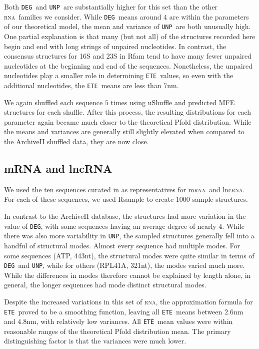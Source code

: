 \documentclass{article}
\newcommand{\RNA}{\textsc{rna}}
\newcommand{\DEG}{{\tt DEG}}
\newcommand{\UNP}{{\tt UNP}}
\newcommand{\ETE}{{\tt ETE}}
\begin{document}
Both \DEG\ and \UNP\ are substantially higher for this set than the other \RNA\ families we consider.  While \DEG\ means around $4$ are within the parameters of our theoretical model, the mean and variance of \UNP\ are both unusually high.  One partial explanation is that many (but not all) of the structures recorded here begin and end with long strings of unpaired nucleotides.  In contrast, the consensus structures for 16S and 23S in Rfam \cite{Griffiths:2003} tend to have many fewer unpaired nucleotides at the beginning and end of the sequences.  Nonetheless, the unpaired nucleotides play a smaller role in determining \ETE\ values, so even with the additional nucleotides, the \ETE\ means are less than $7$nm.



We again shuffled each sequence $5$ times using uShuffle and predicted MFE structures for each shuffle.  After this process, the resulting distributions for each parameter again became much closer to the theoretical Pfold distribution.  While the means and variances are generally still slightly elevated when compared to the ArchiveII shuffled data, they are now close.

\subsection{mRNA and lncRNA}

We used the ten sequences curated in \cite{Lai:2018} as representatives for m\RNA\ and lnc\RNA.  For each of these sequences, we used Rsample to create 1000 sample structures.

In contrast to the ArchiveII database, the structures had more variation in the value of \DEG, with some sequences having an average degree of nearly $4$.  While there was also more variability in \UNP, the sampled structures generally fell into a handful of structural modes.  Almost every sequence had multiple modes.  For some sequences (ATP, 443nt), the structural modes were quite similar in terms of \DEG\ and \UNP, while for others (RPL41A, 321nt), the modes varied much more.  While the differences in modes therefore cannot be explained by length alone, in general, the longer sequences had mode distinct structural modes.

Despite the increased variations in this set of \RNA, the approximation formula for \ETE\ proved to be a smoothing function, leaving all \ETE\ means between $2.6$nm and $4.8$nm, with relatively low variances.  All \ETE\ mean values were within reasonable ranges of the theoretical Pfold distribution mean.  The primary distinguishing factor is that the variances were much lower.
\end{document}
